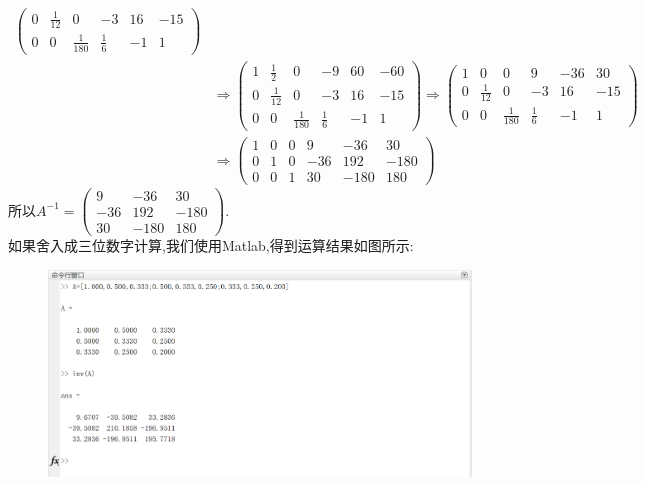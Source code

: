 ﻿\documentclass{book} \usepackage{exsheets} \usepackage{xeCJK}
\begin{document}
\begin{solution}
\begin{align*}
\begin{pmatrix}
                                                                                                                     0&\frac{1}{12}&0&-3&16&-15\\
                                                                                                                     0&0&\frac{1}{180}&\frac{1}{6}&-1&1 \end{pmatrix}\\&\Rightarrow
                                                                                                                                                                         \begin{pmatrix}
                                                                                                                                                                           1&\frac{1}{2}&0&-9&60&-60\\
0&\frac{1}{12}&0&-3&16&-15\\
0&0&\frac{1}{180}&\frac{1}{6}&-1&1
                                                                                                                                                                         \end{pmatrix}\Rightarrow
                                  \begin{pmatrix}
                                    1&0&0&9&-36&30\\
0&\frac{1}{12}&0&-3&16&-15\\
0&0&\frac{1}{180}&\frac{1}{6}&-1&1
                                  \end{pmatrix}\\&\Rightarrow
                                                   \begin{pmatrix}
                                                     1&0&0&9&-36&30\\
0&1&0&-36&192&-180\\
0&0&1&30&-180&180
                                                   \end{pmatrix}
  \end{align*}
所以$A^{-1}=
\begin{pmatrix}
  9&-36&30\\
-36&192&-180\\
30&-180&180
\end{pmatrix}
$.\\
如果舍入成三位数字计算,我们使用Matlab,得到运算结果如图所示:
\begin{figure}[h]
  \centering
  \includegraphics[width=1.3\textwidth]{1.png}

\end{figure}
\end{solution}
\end{document}
